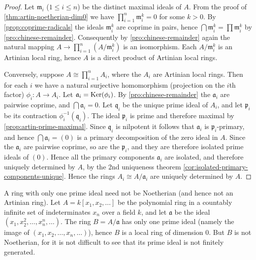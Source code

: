 \begin{proof}
Let $\mathfrak{m}_i$ ($1 \leq i \leq n$) be the distinct maximal ideals of $A$. From the proof of \eqref{thm:artin-noetherian-dim0} we have $\prod_{i=1}^n \mathfrak{m}_i^k = 0$ for some $k > 0$. By \eqref{prop:coprime-radicals} the ideals $\mathfrak{m}_i^k$ are coprime in pairs, hence $\bigcap \mathfrak{m}_i^k = \prod \mathfrak{m}_i^k$ by \eqref{pro:chinese-remainder}. Consequently by \eqref{pro:chinese-remainder} again the natural mapping $A \to \prod_{i=1}^n (A/\mathfrak{m}_i^k)$ is an isomorphism. Each $A/\mathfrak{m}_i^k$ is an Artinian local ring, hence $A$ is a direct product of Artinian local rings.

Conversely, suppose $A \cong \prod_{i=1}^n A_i$, where the $A_i$ are Artinian local rings. Then for each $i$ we have a natural surjective homomorphism (projection on the $i$th factor) $\phi_i \colon A \to A_i$. Let $\mathfrak{a}_i = \operatorname{Ker}(\phi_i)$. By \eqref{pro:chinese-remainder} the $\mathfrak{a}_i$ are pairwise coprime, and $\bigcap \mathfrak{a}_i = 0$. Let $\mathfrak{q}_i$ be the unique prime ideal of $A_i$, and let $\mathfrak{p}_i$ be its contraction $\phi_i^{-1}(\mathfrak{q}_i)$. The ideal $\mathfrak{p}_i$ is prime and therefore maximal by \eqref{prop:artin-prime-maximal}. Since $\mathfrak{q}_i$ is nilpotent it follows that $\mathfrak{a}_i$ is $\mathfrak{p}_i$-primary, and hence $\bigcap \mathfrak{a}_i = (0)$ is a primary decomposition of the zero ideal in $A$. Since the $\mathfrak{a}_i$ are pairwise coprime, so are the $\mathfrak{p}_i$, and they are therefore isolated prime ideals of $(0)$. Hence all the primary components $\mathfrak{a}_i$ are isolated, and therefore uniquely determined by $A$, by the 2nd uniqueness theorem \eqref{cor:isolated-primary-components-unique}. Hence the rings $A_i \cong A/\mathfrak{a}_i$ are uniquely determined by $A$.
\end{proof}

\begin{example}
A ring with only one prime ideal need not be Noetherian (and hence not an Artinian ring). Let $A = k[x_1, x_2, \ldots]$ be the polynomial ring in a countably infinite set of indeterminates $x_n$ over a field $k$, and let $\mathfrak{a}$ be the ideal $(x_1, x_2^2, \ldots, x_n^n, \ldots)$. The ring $B = A/\mathfrak{a}$ has only one prime ideal (namely the image of $(x_1, x_2, \ldots, x_n, \ldots)$), hence $B$ is a local ring of dimension 0. But $B$ is not Noetherian, for it is not difficult to see that its prime ideal is not finitely generated.
\end{example}

